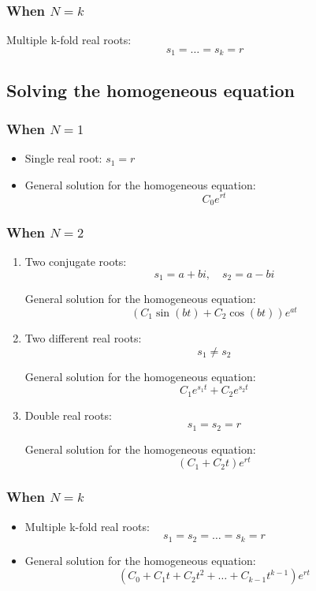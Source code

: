 \documentclass[11pt]{article}
\begin{document}
\subsubsection{When \(N = k\)}
\label{sec:orgc58010a}
Multiple k-fold real roots:
\[s_1 = \ldots = s_k = r\]
\subsection{Solving the homogeneous equation}
\label{sec:org6bdaab7}

\subsubsection{When \(N = 1\)}
\label{sec:orgb275070}
\begin{itemize}
\item Single real root: \(s_1 = r\)
\item General solution for the homogeneous equation:
\[C_0 e^{rt}\]
\end{itemize}
\subsubsection{When \(N = 2\)}
\label{sec:org675e713}
\begin{enumerate}
\item Two conjugate roots:
\[s_1 = a + bi, \quad s_2 = a - bi\]

General solution for the homogeneous equation:
\[(C_1 \sin (bt) + C_2 \cos (bt)) e^{at}\]

\item Two different real roots:
\[s_1 \ne s_2\]

General solution for the homogeneous equation:
\[C_1 e^{s_1 t} + C_2 e^{s_2 t}\]

\item Double real roots:
\[s_1 = s_2 = r\]

General solution for the homogeneous equation:
\[(C_1 + C_2 t) e^{rt}\]
\end{enumerate}
\subsubsection{When \(N = k\)}
\label{sec:orgb18885c}
\begin{itemize}
\item Multiple k-fold real roots:
\[s_1 = s_2 = \ldots = s_k = r\]
\item General solution for the homogeneous equation:
\[(C_0 + C_1 t + C_2 t^2 + \ldots + C_{k - 1} t^{k - 1}) e^{rt}\]
\end{itemize}
\end{document}
